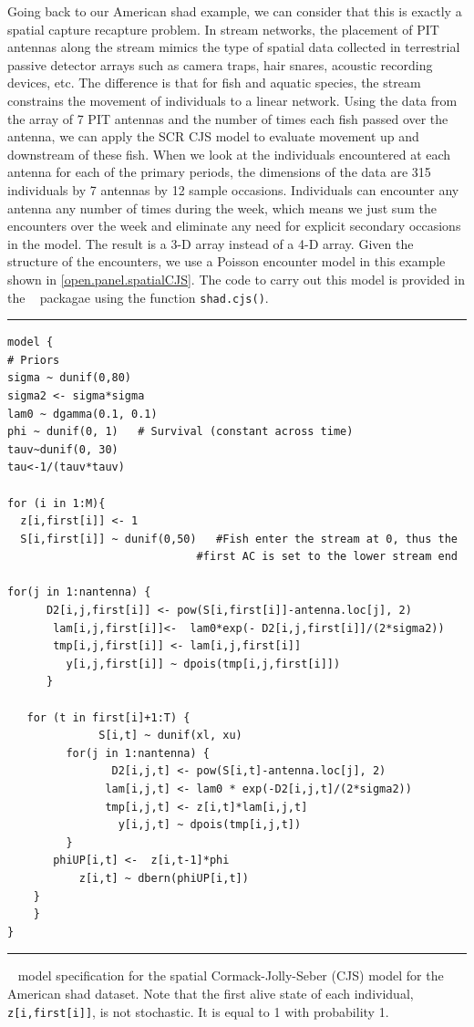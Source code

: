 Going back to our American shad example, we can consider that this is
exactly a spatial capture recapture problem.  In stream networks, the
placement of PIT antennas along the stream mimics the type of spatial
data collected in terrestrial passive detector arrays such as camera
traps, hair snares, acoustic recording devices, etc.  The difference
is that for fish and aquatic species, the stream constrains the
movement of individuals to a linear network.  Using the data from the
array of 7 PIT antennas and the number of times each fish passed over
the antenna, we can apply the SCR CJS model to evaluate movement up
and downstream of these fish.  When we look at the individuals
encountered at each antenna for each of the primary periods, the
dimensions of the data are 315 individuals by 7 antennas by 12 sample
occasions. Individuals can encounter any antenna any number of times
during the week, which means we just sum the encounters over the week
and eliminate any need for explicit secondary occasions in the
model. The result is a 3-D array instead of a 4-D array.  Given the
structure of the encounters, we use a Poisson encounter model in this
example shown in \ref{open.panel.spatialCJS}.  The code to carry out
this model is provided in the \scrbook~ packagae using the function
\verb+shad.cjs()+.


\begin{panel}[htp]
\centering
\rule[0.1in]{\textwidth}{.03in}
{\small
\begin{verbatim}
model {
# Priors
sigma ~ dunif(0,80)
sigma2 <- sigma*sigma
lam0 ~ dgamma(0.1, 0.1)
phi ~ dunif(0, 1)   # Survival (constant across time)
tauv~dunif(0, 30)
tau<-1/(tauv*tauv)

for (i in 1:M){
  z[i,first[i]] <- 1
  S[i,first[i]] ~ dunif(0,50)   #Fish enter the stream at 0, thus the
			                 #first AC is set to the lower stream end

for(j in 1:nantenna) {
	  D2[i,j,first[i]] <- pow(S[i,first[i]]-antenna.loc[j], 2)
       lam[i,j,first[i]]<-  lam0*exp(- D2[i,j,first[i]]/(2*sigma2))
       tmp[i,j,first[i]] <- lam[i,j,first[i]]
         y[i,j,first[i]] ~ dpois(tmp[i,j,first[i]])
      }

   for (t in first[i]+1:T) {
	          S[i,t] ~ dunif(xl, xu) 
         for(j in 1:nantenna) {
		        D2[i,j,t] <- pow(S[i,t]-antenna.loc[j], 2)
               lam[i,j,t] <- lam0 * exp(-D2[i,j,t]/(2*sigma2))
	           tmp[i,j,t] <- z[i,t]*lam[i,j,t]
		         y[i,j,t] ~ dpois(tmp[i,j,t])
		 }
 	   phiUP[i,t] <-  z[i,t-1]*phi
	       z[i,t] ~ dbern(phiUP[i,t])
	}
	}
}
\end{verbatim}
}
\rule[-0.1in]{\textwidth}{.03in}
\caption{
\jags~ model specification for the spatial
Cormack-Jolly-Seber (CJS) model for the American shad dataset. Note that the first alive state of
each individual, \mbox{\tt z[i,first[i]]}, is not stochastic. It is
equal to 1 with probability 1.}
\label{open.panel.spatialCJS}
\end{panel}







